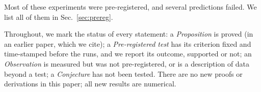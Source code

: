 Most of these experiments were pre-registered, and several predictions failed.
We list all of them in Sec.~\ref{sec:prereg}.

Throughout, we mark the status of every statement:
a \emph{Proposition} is proved (in an earlier paper, which we cite);
a \emph{Pre-registered test} has its criterion fixed and time-stamped before the runs, and we report its outcome, supported or not;
an \emph{Observation} is measured but was not pre-registered, or is a description of data beyond a test;
a \emph{Conjecture} has not been tested.
There are no new proofs or derivations in this paper; all new results are numerical.
